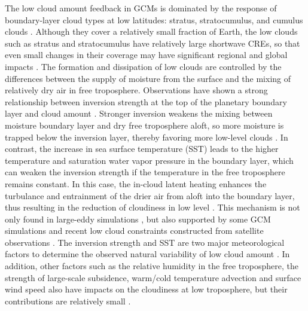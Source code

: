 The low cloud amount feedback in GCMs is dominated by the response of boundary-layer cloud types at low latitudes: stratus, stratocumulus, and cumulus clouds \citep{Ceppi2017}. Although they cover a relatively small fraction of Earth, the low clouds such as stratus and stratocumulus have relatively large shortwave CREs, so that even small changes in their coverage may have significant regional and global impacts \citep[e.g.,][]{Schneider2019}. The formation and dissipation of low clouds are controlled by the differences between the supply of moisture from the surface and the mixing of relatively dry air in free troposphere. Observations have shown a strong relationship between inversion strength at the top of the planetary boundary layer and cloud amount \citep{Gordon1992,Klein1993,Wood2006}. Stronger inversion weakens the mixing between moisture boundary layer and dry free troposphere aloft, so more moisture is trapped below the inversion layer, thereby favoring more low-level clouds \citep[e.g.,][]{Qu2014,Qu2015positive,Scott2020}. In contrast, the increase in sea surface temperature (SST) leads to the higher temperature and saturation water vapor pressure in the boundary layer, which can weaken the inversion strength if the temperature in the free troposphere remains constant. In this case, the in-cloud latent heating enhances the turbulance and entrainment of the drier air from aloft into the boundary layer, thus resulting in the reduction of cloudiness in low level \citep[e.g.,][]{Rieck2012, Webb2013coupling, Qu2014, Bretherton2015, Brient2016,Myers2016,Ceppi2017relationship,Scott2020}. This mechanism is not only found in large-eddy simulations \citep{Bretherton2015}, but also supported by some GCM simulations \citep[e.g.,][]{Zhang2013CGILS,Myers2016} and recent low cloud constraints constructed from satellite observations \citep{Scott2020,Myers2021}. The inversion strength and SST are two major meteorological factors to determine the observed natural variability of low cloud amount \citep[e.g.,][]{Zhou2016,Cesana2021}. In addition, other factors such as the relative humidity in the free troposphere, the strength of large-scale subsidence, warm/cold temperature advection and surface wind speed also have impacts on the cloudiness at low troposphere, but their contributions are relatively small \citep[e.g.,][]{Bretherton2015,Myers2016,Scott2020}.
